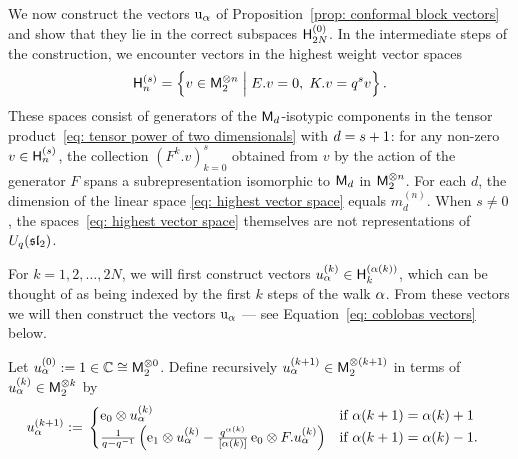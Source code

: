 \documentclass[oneside,english]{amsart}
\numberwithin{equation}{section}
\numberwithin{figure}{section}
\theoremstyle{plain}
\theoremstyle{plain}
\theoremstyle{plain}
\theoremstyle{remark}
\theoremstyle{plain}
\theoremstyle{plain}
\theoremstyle{plain}
\theoremstyle{plain}
\theoremstyle{plain}
\theoremstyle{plain}
\theoremstyle{plain}
\theoremstyle{plain}
\newcommand{\blue}[1]{{\color{blue} #1}}
\begin{document}
We now construct the vectors $\mathrm{u}_\alpha$ of Proposition~\ref{prop: conformal block vectors} and show that they lie in the correct subspaces $\mathsf{H}_{2N}^{(0)}$.
In the intermediate steps of the construction,
we encounter vectors in the highest weight vector 
spaces
\begin{align} \label{eq: highest vector space}
\mathsf{H}_{n}^{(s)} = \left\{  v \in \mathsf{M}_{2}^{\otimes n} \; \Big| \; E.v=0 ,\;K.v = q^{s}v \right\} . 
\end{align}
These spaces consist of generators of the $\mathsf{M}_{d}$-isotypic components in the tensor
product~\eqref{eq: tensor power of two dimensionals} with $d = s + 1$:
for any non-zero $v \in \mathsf{H}_{n}^{(s)}$, the collection $(F^k.v)_{k=0}^s$ 
obtained from $v$ by the action of the generator $F$ spans a subrepresentation 
isomorphic to $\mathsf{M}_{d}$ in $\mathsf{M}_{2}^{\otimes n}$.
For each $d$, the dimension of the linear space 
\eqref{eq: highest vector space} equals $m_d^{(n)}$.
When $s \neq 0$,
the spaces~\eqref{eq: highest vector space} themselves are not %
representations of ${U}_{q}(\mathfrak{sl}_{2})$. %

For $k=1,2,\ldots,2N$,
we will first construct vectors $u_\alpha^{(k)} \in \mathsf{H}_{k}^{(\alpha(k))}$, 
which can be thought of as being indexed by the first $k$ steps of the walk $\alpha$.
From these vectors we will then construct the vectors $\mathrm{u}_\alpha$ --- see Equation~\eqref{eq: coblobas vectors} below.

Let $u_\alpha^{(0)} := 1 \in \mathbb{C} \cong \mathsf{M}_2^{\otimes 0}$. 
Define recursively
$u_\alpha^{(k+1)} \in \mathsf{M}_2^{\otimes (k+1)}$ in terms of $u_\alpha^{(k)} \in \mathsf{M}_2^{\otimes k}$ by
\begin{align}\label{eq: coblobas vector recursive construction}
u_\alpha^{(k+1)} := \; & \begin{cases}
\mathrm{e}_0 \otimes u_\alpha^{(k)} & \text{if }\alpha(k+1) = \alpha(k)+1 \\
\frac{1}{q-q^{-1}}\left( \mathrm{e}_1 \otimes u_\alpha^{(k)} 
- \frac{q^{\alpha(k)}}{\left[\alpha(k)\right]}\,\mathrm{e}_0 \otimes F.u_\alpha^{(k)} \right) 
& \text{if } \alpha(k+1) = \alpha(k)-1. \end{cases}
\end{align}
\end{document}
